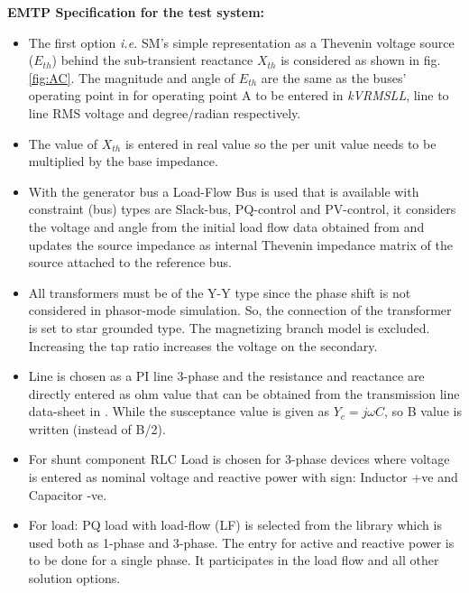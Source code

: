 \documentclass{report}
\begin{document}
\textbf{EMTP Specification for the test system:}
\begin{itemize}
    \item The first option \textit{i.e.} SM's simple representation as a Thevenin voltage source ($E_{th}$) behind the sub-transient reactance $X_{th}$ is considered as shown in fig. \ref{fig:AC}. The magnitude and angle of $E_{th}$ are the same as the buses' operating point in \cite{van2015test} for operating point A to be entered in \textit{kVRMSLL}, line to line RMS voltage and degree/radian respectively. 
    \item The value of $X_{th}$ is entered in real value so the per unit value needs to be multiplied by the base impedance.  
    \item With the generator bus a Load-Flow Bus is used that is available with constraint (bus) types are Slack-bus, PQ-control and PV-control, it considers the voltage and angle from the initial load flow data obtained from \cite{van2015test} and updates the source impedance as internal Thevenin impedance matrix of the source attached to the reference bus.
    \item All transformers must be of the Y-Y type since the phase shift is not considered in phasor-mode simulation. So, the connection of the transformer is set to star grounded type. The magnetizing branch model is excluded. Increasing the tap ratio increases the voltage on the secondary. 
    \item Line is chosen as a PI line 3-phase and the resistance and reactance are directly entered as ohm value that can be obtained from the transmission line data-sheet in \cite{van2015test}. While the susceptance value is given as $Y_c=j\omega C$, so B value is written (instead of B/2). 
    \item For shunt component RLC Load is chosen for 3-phase devices where voltage is entered as nominal voltage and reactive power with sign: Inductor +ve and Capacitor -ve. 
    \item For load: PQ load with load-flow (LF) is selected from the library which is used both as 1-phase and 3-phase. The entry for active and reactive power is to be done for a single phase. It participates in the load flow and all other solution options.
\end{itemize}
\end{document}
